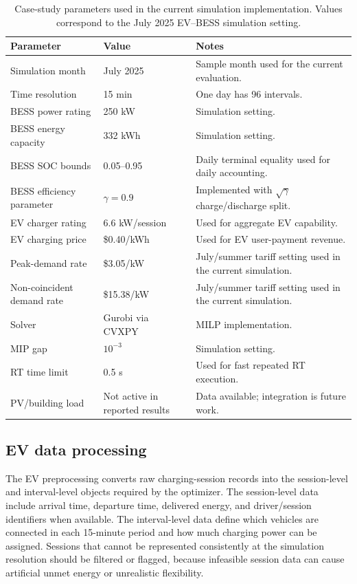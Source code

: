 \documentclass[final,5p,times]{elsarticle}
\begin{document}
\begin{table}[!t]
\centering
\caption{Case-study parameters used in the current simulation implementation. Values correspond to the July 2025 EV--BESS simulation setting.}
\label{tab:case_parameters}
\scriptsize
\begin{tabularx}{\textwidth}{@{}p{}p{}X@{}}
\toprule
Parameter & Value & Notes \\
\midrule
Simulation month & July 2025 & Sample month used for the current evaluation.\\
Time resolution & 15 min & One day has 96 intervals.\\
BESS power rating & 250 kW & Simulation setting.\\
BESS energy capacity & 332 kWh & Simulation setting.\\
BESS SOC bounds & 0.05--0.95 & Daily terminal equality used for daily accounting.\\
BESS efficiency parameter & $\gamma=0.9$ & Implemented with $\sqrt{\gamma}$ charge/discharge split.\\
EV charger rating & 6.6 kW/session & Used for aggregate EV capability.\\
EV charging price & \$0.40/kWh & Used for EV user-payment revenue.\\
Peak-demand rate & \$3.05/kW & July/summer tariff setting used in the current simulation.\\
Non-coincident demand rate & \$15.38/kW & July/summer tariff setting used in the current simulation.\\
Solver & Gurobi via CVXPY & MILP implementation.\\
MIP gap & $10^{-3}$ & Simulation setting.\\
RT time limit & 0.5 s & Used for fast repeated RT execution.\\
PV/building load & Not active in reported results & Data available; integration is future work.\\
\bottomrule
\end{tabularx}
\end{table}

\subsection{EV data processing}
The EV preprocessing converts raw charging-session records into the session-level and interval-level objects required by the optimizer. The session-level data include arrival time, departure time, delivered energy, and driver/session identifiers when available. The interval-level data define which vehicles are connected in each 15-minute period and how much charging power can be assigned. Sessions that cannot be represented consistently at the simulation resolution should be filtered or flagged, because infeasible session data can cause artificial unmet energy or unrealistic flexibility.
\end{document}
